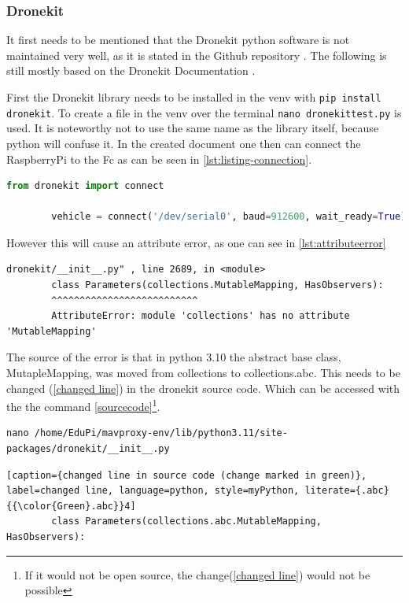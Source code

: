 \documentclass[svgnames]{article}
\begin{document}
	\subsubsection{Dronekit}
	It first needs to be mentioned that the Dronekit python software is not maintained very well, as it is stated in the Github repository \cite{dronekitgithub}. The following is still mostly based on the Dronekit Documentation \cite{dronekitdocs}.
	
	
	First the Dronekit library needs to be installed in the \gls{venv} with \lstinline|pip install dronekit|. To create a file in the \gls{venv} over the terminal \lstinline|nano dronekittest.py| is used. It is noteworthy not to use the same name as the library itself, because python will confuse it. In the created document one then can connect the RaspberryPi to the \gls{Fc} as can be seen in \cref{lst:listing-connection}.
	\begin{lstlisting}[language=Python, style=myPython, caption=Python DroneKit Example, label=lst:listing-connection]
		from dronekit import connect

		vehicle = connect('/dev/serial0', baud=912600, wait_ready=True)
	\end{lstlisting}
	
	However this will cause an attribute error, as one can see in \cref{lst:attributeerror} 
	\begin{lstlisting}[label=lst:attributeerror, caption={AttributeError after connecting}]
		dronekit/__init__.py" , line 2689, in <module>
		class Parameters(collections.MutableMapping, HasObservers):
		^^^^^^^^^^^^^^^^^^^^^^^^^^
		AttributeError: module 'collections' has no attribute 'MutableMapping'
\end{lstlisting}
	The source of the error is that in python 3.10 the abstract base class, MutapleMapping, was moved from collections to collections.abc. This needs to be changed (\cref{changed line}) in the dronekit source code. Which can be accessed with the the command \cref{sourcecode}\footnote{If it would not be open source, the change(\cref{changed line}) would not be possible}.
	
	\begin{lstlisting}[caption= accessing source code, label=sourcecode]
nano /home/EduPi/mavproxy-env/lib/python3.11/site-packages/dronekit/__init__.py
\end{lstlisting}

	\begin{lstlisting}[caption={changed line in source code (change marked in green)}, label=changed line, language=python, style=myPython, literate={.abc}{{\color{Green}.abc}}4]
		class Parameters(collections.abc.MutableMapping, HasObservers):
	\end{lstlisting}
	
\end{document}
